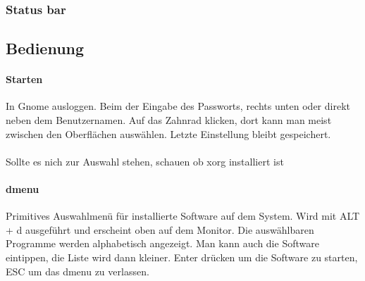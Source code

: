 \documentclass[10pt,a4paper,twoside]{book}
\begin{document}
\subsubsection{Status bar}
\subsection{Bedienung}
\paragraph{Starten}
In Gnome ausloggen. Beim der Eingabe des Passworts, rechts unten oder direkt neben dem Benutzernamen. Auf das Zahnrad klicken, dort kann man meist zwischen den Oberflächen auswählen. Letzte Einstellung bleibt gespeichert.\\
\\
Sollte es nich zur Auswahl stehen, schauen ob xorg installiert ist\\
\paragraph{dmenu}
Primitives Auswahlmenü für installierte Software auf dem System. Wird mit ALT + d ausgeführt und erscheint oben auf dem Monitor. Die auswählbaren Programme werden alphabetisch angezeigt. Man kann auch die Software eintippen, die Liste wird dann kleiner. Enter drücken um die Software zu starten, ESC um das dmenu zu verlassen.
\end{document}
